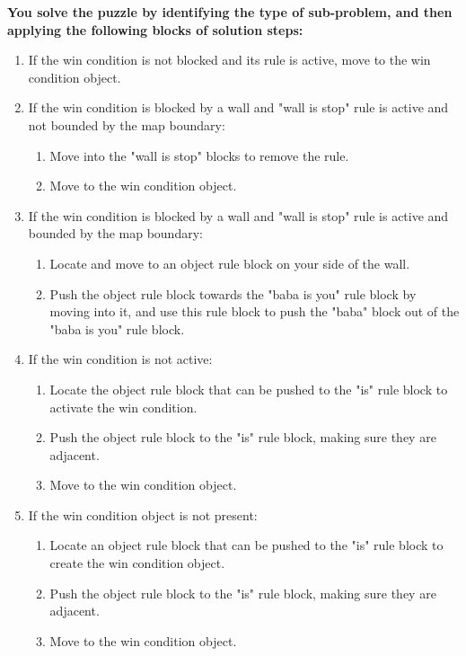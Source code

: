 \begin{GreenBox}[frametitle={\textbf{Iteration 2 Baba-is-ai Prompt}}]
\textbf{You solve the puzzle by identifying the type of sub-problem, and then applying the following blocks of solution steps:}
\begin{enumerate}
    \item If the win condition is not blocked and its rule is active, move to the win condition object.
    \item If the win condition is blocked by a wall and "wall is stop" rule is active and not bounded by the map boundary:
    \begin{enumerate}
        \item Move into the "wall is stop" blocks to remove the rule.
        \item Move to the win condition object.
    \end{enumerate}
    \item If the win condition is blocked by a wall and "wall is stop" rule is active and bounded by the map boundary:
    \begin{enumerate}
        \item Locate and move to an object rule block on your side of the wall.
        \item Push the object rule block towards the "baba is you" rule block by moving into it, and use this rule block to push the "baba" block out of the "baba is you" rule block.
    \end{enumerate}
    \item If the win condition is not active:
    \begin{enumerate}
        \item Locate the object rule block that can be pushed to the "is" rule block to activate the win condition.
        \item Push the object rule block to the "is" rule block, making sure they are adjacent.
        \item Move to the win condition object.
    \end{enumerate}
    \item If the win condition object is not present:
    \begin{enumerate}
        \item Locate an object rule block that can be pushed to the "is" rule block to create the win condition object.
        \item Push the object rule block to the "is" rule block, making sure they are adjacent.
        \item Move to the win condition object.
    \end{enumerate}
\end{enumerate}


\end{GreenBox}

